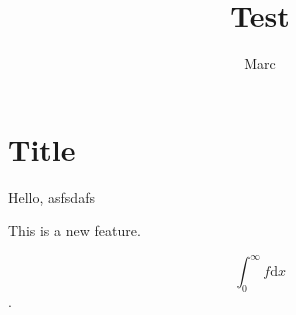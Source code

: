 \documentclass{article}
\begin{document}
\author{Marc}
\title{Test}
\maketitle

\section{Title}
\label{sec:title}
Hello, asfsdafs

This is a new feature.

$$ \int_0^\infty f \mathrm{d}x $$.
\end{document}
